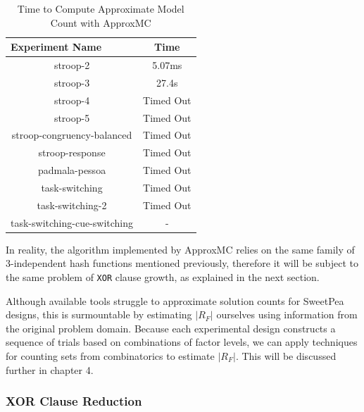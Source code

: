 \begin{table}[t]
  \centering
  \caption{Time to Compute Approximate Model Count with ApproxMC}
\begin{tabular}{|c|c|}
\hline
\multicolumn{1}{|l|}{Experiment Name} & Time            \\ \hline
stroop-2                              & 5.07ms          \\ \hline
stroop-3                              & 27.4s           \\ \hline
stroop-4                              & Timed Out       \\ \hline
stroop-5                              & Timed Out       \\ \hline
stroop-congruency-balanced            & Timed Out       \\ \hline
stroop-response                       & Timed Out       \\ \hline
padmala-pessoa                        & Timed Out       \\ \hline
task-switching                        & Timed Out       \\ \hline
task-switching-2                      & Timed Out       \\ \hline
task-switching-cue-switching          & -               \\ \hline
\end{tabular}
\label{tab:benchmark_experiments_approxmc}%
\end{table}

In reality, the algorithm implemented by ApproxMC relies on the same family of 3-independent hash functions mentioned previously, therefore it will be subject to the same problem of \texttt{XOR} clause growth, as explained in the next section.

Although available tools struggle to approximate solution counts for SweetPea designs, this is surmountable by estimating $|R_F|$ ourselves using information from the original problem domain. Because each experimental design constructs a sequence of trials based on combinations of factor levels, we can apply techniques for counting sets from combinatorics to estimate $|R_F|$. This will be discussed further in chapter 4.

\subsubsection{XOR Clause Reduction}

